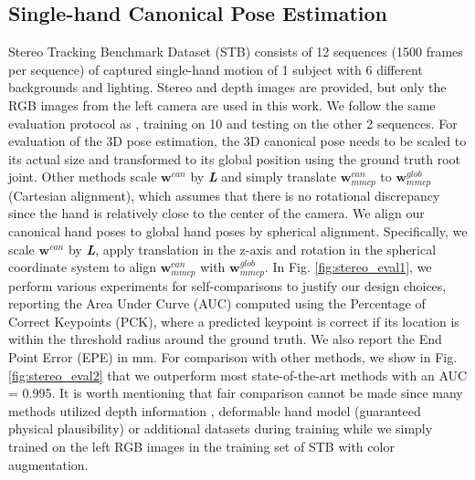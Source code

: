 \documentclass[10pt,twocolumn,letterpaper]{article}
\begin{document}
\subsection{Single-hand Canonical Pose Estimation}\label{sec:experiments_can}
\indent Stereo Tracking Benchmark Dataset (STB) consists of 12 sequences (1500 frames per sequence) of captured single-hand motion of 1 subject with 6 different backgrounds and lighting. Stereo and depth images are provided, but only the RGB images from the left camera are used in this work. We follow the same evaluation protocol as \cite{Zimmermann}, training on 10 and testing on the other 2 sequences. For evaluation of the 3D pose estimation, the 3D canonical pose needs to be scaled to its actual size and transformed to its global position using the ground truth root joint. Other methods scale $\textbf{w}^{can}$ by \textbf{\textit{L}} and simply translate $\textbf{w}^{can}_{mmcp}$ to $\textbf{w}^{glob}_{mmcp}$ (Cartesian alignment), which assumes that there is no rotational discrepancy since the hand is relatively close to the center of the camera. We align our canonical hand poses to global hand poses by spherical alignment. Specifically, we scale $\textbf{w}^{can}$ by \textbf{\textit{L}}, apply translation in the z-axis and rotation in the spherical coordinate system to align $\textbf{w}^{can}_{mmcp}$ with $\textbf{w}^{glob}_{mmcp}$. In Fig. \ref{fig:stereo_eval1}, we perform various experiments for self-comparisons to justify our design choices, reporting the Area Under Curve (AUC) computed using the Percentage of Correct Keypoints (PCK), where a predicted keypoint is correct if its location is within the threshold radius around the ground truth. We also report the End Point Error (EPE) in mm. For comparison with other methods, we show in Fig. \ref{fig:stereo_eval2} that we outperform most state-of-the-art methods with an AUC = 0.995. It is worth mentioning that fair comparison cannot be made since many methods utilized depth information \cite{Ge2,Cai,Iqbal}, deformable hand model (guaranteed physical plausibility) \cite{Ge2,Baek} or additional datasets \cite{Ge2,Baek,Xiang} during training while we simply trained on the left RGB images in the training set of STB with color augmentation.\\
\end{document}
